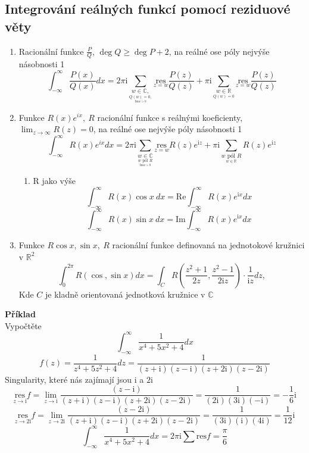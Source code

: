 \documentclass{article}
\newcommand{\mi}{\mathrm{i}}
\newcommand{\re}{\mathrm{Re}}
\newcommand{\im}{\mathrm{Im}}
\newcommand{\res}{\mathrm{res}}
\begin{document}
    \subsection{Integrování reálných funkcí pomocí reziduové věty}
        \begin{enumerate}
            \item Racionální funkce $\frac{P}{Q}$, $\deg Q \geq \deg P+2$, na reálné ose
                    póly nejvýše násobnosti 1
                \[\int_{-\infty}^{\infty}\frac{P(x)}{Q(x)}dx=2\pi\mi\sum_{\underset{\underset{\im w>0}{Q(w)=0,}}{w\in\mathbb{C},}}
                \underset{z=w}{\res}\frac{P(z)}{Q(z)}+\pi\mi\sum_{\underset{Q(w)=0}{w\in\mathbb{R}}}\underset{{z=w}}{\res}
                \frac{P(z)}{Q(z)}\] 
            \item Funkce $R(x)e^{ix},\:R$ racionální funkce s reálnými koeficienty,
                $\lim_{z\to\infty} R(z)=0$, na reálné ose nejvýše póly násobnosti 1
                \[\int_{-\infty}^{\infty}R(x)e^{ix}dx=2\pi\mi\sum_{\underset{\underset{\im w>0}{w\mbox{ pól } R}}{w\in\mathbb{C}}}
                \underset{z=w}{\res}R(z)e^{\mi z}+\pi\mi\sum_{\underset{w\in\mathbb{R}}{w\mbox{ pól }R}}R(z)e^{\mi z}\]
                \begin{enumerate}[label=\alph*.]
                    \item R jako výše
                    \[\int_{-\infty}^{\infty}R(x)\cos x\:dx=\re \int_{-\infty}^{\infty}R(x)e^{\mi x}dx\]
                    \[\int_{-\infty}^{\infty}R(x)\sin x\:dx=\im \int_{-\infty}^{\infty}R(x)e^{\mi x}dx\]
                \end{enumerate}
            \item Funkce $R \cos x, \sin x, \: R$ racionální funkce definovaná na jednotokové kružnici v $\mathbb{R}^2$
                \[\int_{0}^{2\pi}R(\cos,\sin x)dx=\int_CR\left(\frac{z^2+1}{2z},\frac{z^2-1}{2\mi z}\right)\cdot\frac{1}{\mi z}dz,\]
                Kde $C$ je kladně orientovaná jednotková kružnice v $\mathbb{C}$
        \end{enumerate}

    {\bf Příklad}
    \\
    Vypočtěte
        \[\int_{-\infty}^{\infty}\frac{1}{x^4+5x^2+4}dx\]
        \[f(z)=\frac{1}{z^4+5z^2+4}dz=\frac{1}{(z+\mi)(z-\mi)(z+2\mi)(z-2\mi)}\]
        Singularity, které nás zajímají jsou $\mi$ a $2\mi$
        \[\underset{z\to\mi}{\res}f=\lim_{z\to\mi}\frac{(z-\mi)}{(z+\mi)(z-\mi)(z+2\mi)(z-2\mi)}=\frac{1}{(2\mi)(3\mi)(-\mi)}=-\frac{1}{6}\mi\]
        \[\underset{z\to2\mi}{\res}f=\lim_{z\to2\mi}\frac{(z-2\mi)}{(z+\mi)(z-\mi)(z+2\mi)(z-2\mi)}=\frac{1}{(3\mi)(\mi)(4\mi)}=\frac{1}{12}\mi\]
        \[\int_{-\infty}^{\infty}\frac{1}{x^4+5x^2+4}dx=2\pi\mi\sum \res f=\frac{\pi}{6}\]
\end{document}
